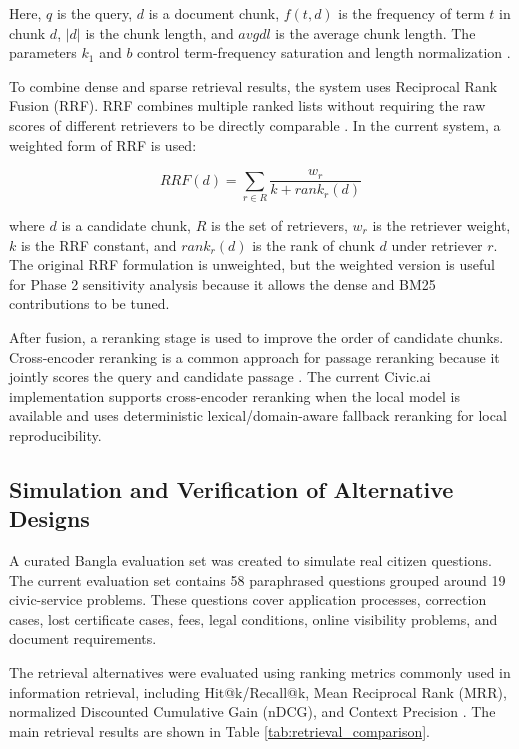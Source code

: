 Here, $q$ is the query, $d$ is a document chunk, $f(t,d)$ is the frequency of term $t$ in chunk $d$, $|d|$ is the chunk length, and $avgdl$ is the average chunk length. The parameters $k_1$ and $b$ control term-frequency saturation and length normalization \cite{robertson2009bm25}.

To combine dense and sparse retrieval results, the system uses Reciprocal Rank Fusion (RRF). RRF combines multiple ranked lists without requiring the raw scores of different retrievers to be directly comparable \cite{cormack2009rrf}. In the current system, a weighted form of RRF is used:

\begin{equation}
RRF(d)=\sum_{r \in R}\frac{w_r}{k+rank_r(d)}
\end{equation}

where $d$ is a candidate chunk, $R$ is the set of retrievers, $w_r$ is the retriever weight, $k$ is the RRF constant, and $rank_r(d)$ is the rank of chunk $d$ under retriever $r$. The original RRF formulation is unweighted, but the weighted version is useful for Phase 2 sensitivity analysis because it allows the dense and BM25 contributions to be tuned.

After fusion, a reranking stage is used to improve the order of candidate chunks. Cross-encoder reranking is a common approach for passage reranking because it jointly scores the query and candidate passage \cite{nogueira2019passagebert}. The current Civic.ai implementation supports cross-encoder reranking when the local model is available and uses deterministic lexical/domain-aware fallback reranking for local reproducibility.

\subsection{Simulation and Verification of Alternative Designs}

A curated Bangla evaluation set was created to simulate real citizen questions. The current evaluation set contains 58 paraphrased questions grouped around 19 civic-service problems. These questions cover application processes, correction cases, lost certificate cases, fees, legal conditions, online visibility problems, and document requirements.

The retrieval alternatives were evaluated using ranking metrics commonly used in information retrieval, including Hit@k/Recall@k, Mean Reciprocal Rank (MRR), normalized Discounted Cumulative Gain (nDCG), and Context Precision \cite{manning2008ir,voorhees1999trec8qa,jarvelin2002ndcg}. The main retrieval results are shown in Table \ref{tab:retrieval_comparison}.

